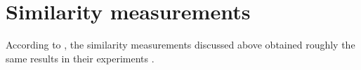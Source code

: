\section{Similarity measurements}\label{sec:evaluation-sim-measurements}

According to \citeauthor{HfsentTrans2019}, the similarity measurements discussed above obtained roughly the same results in their experiments \cite{HfsentTrans2019}.   

